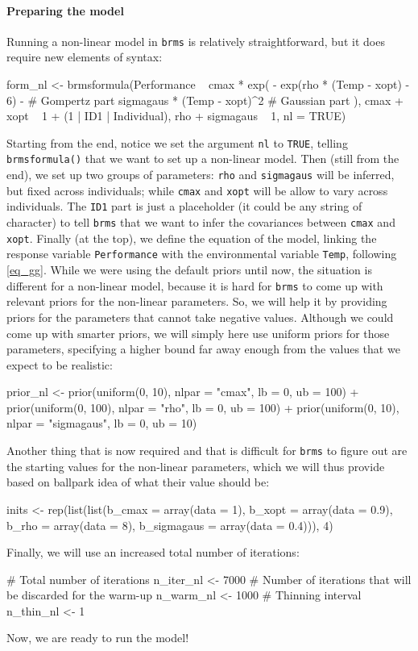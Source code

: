 \documentclass[a4paper,12pt,twoside]{article}
\begin{document}
\paragraph{Preparing the model}
Running a non-linear model in \texttt{brms} is relatively straightforward, but it does require new elements of syntax:
\begin{Rinput}
form_nl <- brmsformula(Performance ~ cmax * exp(
                                        - exp(rho * (Temp - xopt) - 6) -       # Gompertz part
                                            sigmagaus * (Temp - xopt)^2        # Gaussian part
                                    ),
                        cmax + xopt ~ 1 + (1 | ID1 | Individual),
                        rho + sigmagaus ~ 1,
                        nl = TRUE)
\end{Rinput}
Starting from the end, notice we set the argument \texttt{nl} to \texttt{TRUE}, telling \texttt{brmsformula()} that we want to set up a non-linear model. Then (still from the end), we set up two groups of parameters: \texttt{rho} and \texttt{sigmagaus} will be inferred, but fixed across individuals; while \texttt{cmax} and \texttt{xopt} will be allow to vary across individuals.
The \texttt{ID1} part is just a placeholder (it could be any string of character) to tell \texttt{brms} that we want to infer the covariances between \texttt{cmax} and \texttt{xopt}.
Finally (at the top), we define the equation of the model, linking the response variable \texttt{Performance} with the environmental variable \texttt{Temp}, following \autoref{eq_gg}.
While we were using the default priors until now, the situation is different for a non-linear model, because it is hard for \texttt{brms} to come up with relevant priors for the non-linear parameters.
So, we will help it by providing priors for the parameters that cannot take negative values. 
Although we could come up with smarter priors, we will simply here use uniform priors for those parameters, specifying a higher bound far away enough from the values that we expect to be realistic:
\begin{Rinput}
prior_nl <- 
    prior(uniform(0, 10), nlpar = "cmax", lb = 0, ub = 100) +
    prior(uniform(0, 100), nlpar = "rho", lb = 0, ub = 100) +
    prior(uniform(0, 10), nlpar = "sigmagaus", lb = 0, ub = 10)
\end{Rinput}
Another thing that is now required and that is difficult for \texttt{brms} to figure out are the starting values for the non-linear parameters, which we will thus provide based on ballpark idea of what their value should be:
\begin{Rinput}
inits <- rep(list(list(b_cmax      = array(data = 1),
                        b_xopt      = array(data = 0.9),
                        b_rho       = array(data = 8),
                        b_sigmagaus = array(data = 0.4))), 4)
\end{Rinput}
Finally, we will use an increased total number of iterations:
\begin{Rinput}
# Total number of iterations
n_iter_nl <- 7000
# Number of iterations that will be discarded for the warm-up
n_warm_nl <- 1000
# Thinning interval
n_thin_nl <- 1
\end{Rinput}
Now, we are ready to run the model!
\end{document}
